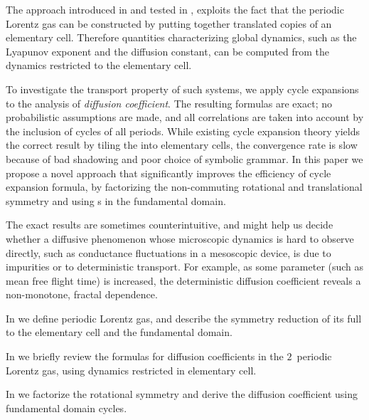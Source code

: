 The approach introduced in  and tested in
, exploits the fact that the periodic Lorentz gas can be
constructed by putting together translated copies of an elementary cell.
Therefore quantities characterizing global dynamics, such as the Lyapunov
exponent and the diffusion constant, can be computed from the dynamics
restricted to the elementary cell.

To investigate the transport property of such systems, we apply cycle
expansions to the analysis of {\em diffusion coefficient}.
The resulting formulas are exact; no probabilistic assumptions are made,
and all correlations are taken into account by the  inclusion of cycles
of all periods. While existing cycle expansion theory yields the correct
result by tiling the {\statesp} into elementary cells, the convergence
rate is slow because of bad shadowing and poor choice of symbolic
grammar. In this paper we propose a novel approach that
significantly improves the efficiency of cycle expansion formula, by
factorizing the non-commuting rotational and translational symmetry and
using \po s in the fundamental domain.

\bigskip

The exact results are sometimes counterintuitive, and might help us
decide whether a diffusive phenomenon whose microscopic dynamics is hard
to observe directly, such as conductance fluctuations in a mesoscopic
device, is due to impurities or to deterministic transport. For example,
as some parameter (such as mean free flight time) is increased, the
deterministic diffusion coefficient reveals a non-monotone, fractal
dependence.

\bigskip

In  we define periodic Lorentz gas, and describe the
symmetry reduction of its full {\statesp} to the elementary
cell and the fundamental domain.

In 
we briefly review the formulas for diffusion
coefficients in the $2$\dmn\ periodic Lorentz gas, using dynamics
restricted in elementary cell.

In  we
factorize the rotational symmetry and derive the diffusion coefficient
using fundamental domain cycles.
